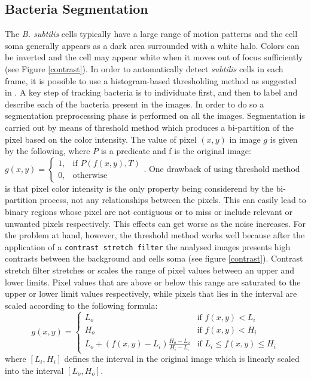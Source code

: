 \documentclass[conference]{IEEEtran}
\begin{document}
\subsection{Bacteria Segmentation}

The \textit{B. subtilis} cells typically have a large range of motion patterns and the cell soma generally appears as a dark area surrounded with a white halo.
Colors can be inverted and the cell may appear white when it  moves out of focus sufficiently (see Figure \ref{contrast}).
In order to automatically detect \textit{subtilis} cells in each frame, it is possible to use a histogram-based thresholding method as suggested in \cite{Cho:1989}.
A key step of tracking bacteria is to individuate first, and then to label and describe each of the bacteria present in the images.
In order to do so a segmentation preprocessing phase is performed on all the images. 
Segmentation  is carried out by means of threshold method \cite{Shapiro:2002} which produces a bi-partition of the pixel based on the color intensity. The value of pixel $(x,y)$ in image $g$ is given by the following, where $P$ is a predicate and f is the original image:
${g(x,y) = \begin{cases} 1, & \mbox{if } P(f(x,y),T) \\ 0, & \mbox{otherwise }\end{cases}}$.
One drawback of using threshold method is that pixel color intensity is the only property being considerend by the bi-partition process, not any relationships between the pixels. This can easily lead to binary regions whose pixel are not contiguous or to miss or include relevant or unwanted pixels respectively. This effects can get worse as the noise increases. For the problem at hand, however, the threshold method works well because after the application of a \texttt{contrast stretch filter} the analysed images presents high contrasts between the background and cells soma (see figure \ref{contrast}).
Contrast stretch filter  stretches or scales the range of pixel values between an upper and lower limits.
Pixel values that are above or below this range are saturated to the upper or lower limit values respectively, while pixels that lies in the interval are scaled according to the following formula: 
\[{g(x,y) = \begin{cases} L_o & \mbox{if } f(x,y) < L_i \\  H_o & \mbox{if } f(x,y) < H_i\\ L_o + (f(x,y)-L_i)\frac{H_o-L_o}{H_i-L_i} & \mbox{if } L_i \leq f(x,y) \leq H_i\end{cases}}\] where  $[L_i,H_i]$ defines the interval in the original image which is linearly scaled into the interval $[L_o,H_o]$.
\end{document}
